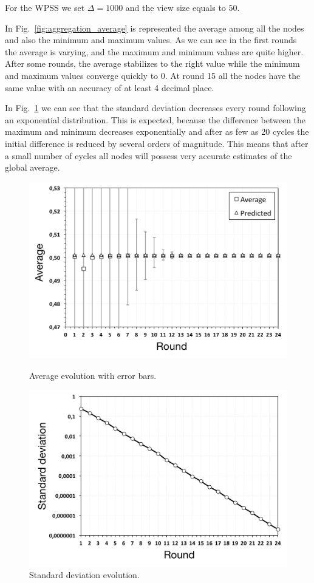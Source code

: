 For the WPSS we set $\Delta = 1000$ and the view size equals to $50$. 

In Fig.~\ref{fig:aggregation_average} is represented the average among all the nodes and also the minimum and maximum values. As we can see in the first rounds the average is varying, and the maximum and minimum values are quite higher. After some rounds, the average stabilizes to the right value while the minimum and maximum values converge quickly to 0. At round 15 all the nodes have the same value with an accuracy of at least 4 decimal place. 

In Fig.~\ref{fig:aggregation_standard_deviation} we can see that the standard deviation decreases every round following an exponential distribution. This is expected, because the difference between the maximum and minimum decreases exponentially and after as few as 20 cycles the initial difference is reduced by several orders of magnitude. This means that after a small number of cycles all nodes will possess very accurate estimates of the global average.

\begin{figure}[p]
\centering
\includegraphics[keepaspectratio=true, width=\textwidth]{images/aggregation_average}
\caption{Average evolution with error bars.}
\label{fig:aggregation_average}
\includegraphics[keepaspectratio=true, width=\textwidth]{images/aggregation_standard_deviation}
\caption{Standard deviation evolution.}
\label{fig:aggregation_standard_deviation}
\end{figure}

